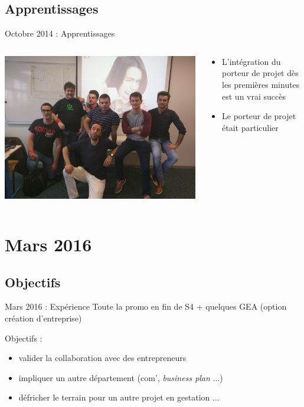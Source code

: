 \documentclass{beamer}
\begin{document}
\subsection{Apprentissages}
\begin{frame}{Octobre 2014 : Apprentissages}
  \begin{columns}
    \begin{column}{0.5\textwidth}
      \begin{center}
        \includegraphics[width=\textwidth]{includes/201510_ausecours.jpg}      
      \end{center}
    \end{column}
    \begin{column}{0.5\textwidth}
      \begin{itemize}
        \item L'intégration du porteur de projet dès les premières minutes est un vrai succès
        \item Le porteur de projet était particulier
      \end{itemize}
    \end{column}
  \end{columns}
\end{frame}

\section{Mars 2016}
\subsection{Objectifs}
\begin{frame}{Mars 2016 : Expérience}
  Toute la promo en fin de S4 + quelques GEA (option création d'entreprise)

  Objectifs : 
  \begin{itemize}
    \item valider la collaboration avec des entrepreneurs
    \item impliquer un autre département (com', \textit{business plan} ...)
    \item défricher le terrain pour un autre projet en gestation ...
  \end{itemize}
\end{frame}
\end{document}
